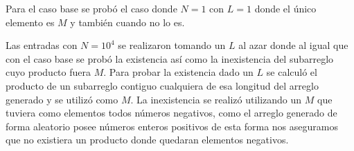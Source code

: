 Para el caso base se probó el caso donde $N = 1$ con $L = 1$ donde el único
elemento es $M$ y también cuando no lo es.

Las entradas con $N = 10^4$ se realizaron tomando un $L$ al azar donde al igual
que con el caso base se probó la existencia así como la inexistencia del
subarreglo cuyo producto fuera $M$. Para probar la existencia dado un $L$ se
calculó el producto de un subarreglo contiguo cualquiera de esa longitud del
arreglo generado y se utilizó como $M$. La inexistencia se realizó utilizando un
$M$ que tuviera como elementos todos números negativos, como el arreglo generado
de forma aleatorio posee números enteros positivos de esta forma nos aseguramos
que no existiera un producto donde quedaran elementos negativos.
